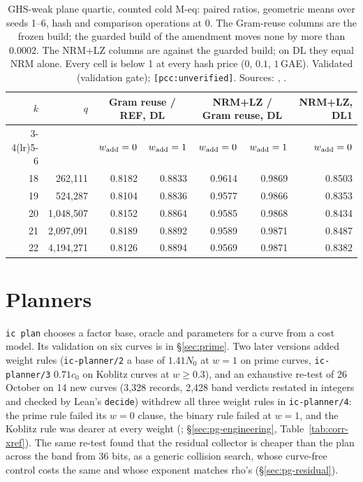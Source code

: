 \begin{table}[t]
\centering\small
\begin{tabular}{@{}rrrrrrr@{}}
\toprule
$k$ & $q$ & \multicolumn{2}{c}{Gram reuse / REF, DL} & \multicolumn{2}{c}{NRM+LZ / Gram reuse, DL} & NRM+LZ, DL1 \\
\cmidrule(lr){3-4}\cmidrule(lr){5-6}
 & & $w_{\rm add}=0$ & $w_{\rm add}=1$ & $w_{\rm add}=0$ & $w_{\rm add}=1$ & $w_{\rm add}=0$ \\
\midrule
18 & 262{,}111 & 0.8182 & 0.8833 & 0.9614 & 0.9869 & 0.8503 \\
19 & 524{,}287 & 0.8104 & 0.8836 & 0.9577 & 0.9866 & 0.8353 \\
20 & 1{,}048{,}507 & 0.8152 & 0.8864 & 0.9585 & 0.9868 & 0.8434 \\
21 & 2{,}097{,}091 & 0.8189 & 0.8892 & 0.9589 & 0.9871 & 0.8487 \\
22 & 4{,}194{,}271 & 0.8126 & 0.8894 & 0.9569 & 0.9871 & 0.8382 \\
\bottomrule
\end{tabular}
\caption[]{GHS-weak plane quartic, counted cold M-eq: paired ratios,
geometric means over seeds 1--6, hash and comparison operations at 0. The
Gram-reuse columns are the frozen build; the guarded build of the
amendment moves none by more than $0.0002$. The NRM+LZ columns are against
the guarded build; on DL they equal NRM alone. Every cell is below 1 at
every hash price ($0$, $0.1$, $1$\,GAE). Validated (validation gate);
\texttt{[pcc:unverified]}. Sources:
,
.}
\label{tab:in-gw-la}
\end{table}

\section{Planners}\label{sec:in-planners}

\texttt{ic plan} chooses a factor base, oracle and parameters for a curve
from a cost model. Its validation on six curves is in \S\ref{sec:prime}.
Two later versions added weight rules (\texttt{ic-planner/2} a base of
$1.41N_0$ at $w=1$ on prime curves, \texttt{ic-planner/3} $0.71c_0$ on Koblitz
curves at $w\ge0.3$), and an exhaustive re-test of 26 October on 14 new
curves (3{,}328 records, 2{,}428 band verdicts restated in integers and
checked by Lean's \texttt{decide}) withdrew all three weight rules in
\texttt{ic-planner/4}: the prime rule failed its $w=0$ clause, the binary
rule failed at $w=1$, and the Koblitz rule was dearer at every weight
(;
\S\ref{sec:pg-engineering}, Table~\ref{tab:corr-xref}). The same re-test
found that the residual collector is cheaper than the plan across the band
from 36 bits, as a generic collision search, whose curve-free control costs
the same and whose exponent matches rho's (\S\ref{sec:pg-residual}).

